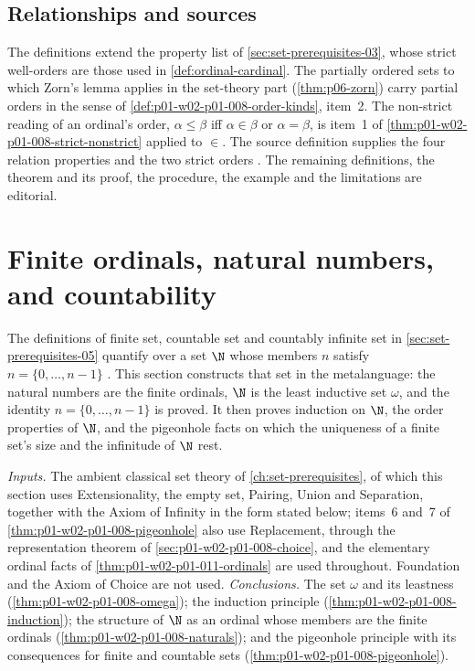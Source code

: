 \subsection{Relationships and sources}
\label{sec:p01-w02-p01-008-orders-sources}

The definitions extend the property list of \cref{sec:set-prerequisites-03},
whose strict well-orders are those used in \cref{def:ordinal-cardinal}. The
partially ordered sets to which Zorn's lemma applies in the set-theory part
(\cref{thm:p06-zorn}) carry partial orders in the sense of
\cref{def:p01-w02-p01-008-order-kinds}, item~2.
The non-strict reading of an ordinal's order, \(\alpha\leq\beta\) iff
\(\alpha\in\beta\) or \(\alpha=\beta\), is item~1 of
\cref{thm:p01-w02-p01-008-strict-nonstrict} applied to \(\in\). The source
definition supplies the four relation properties and the two strict orders
\cite[ch.~``Sets, Relations, Functions, and Cardinality'', sec.~``Relations
and functions'', definition ``Properties of a binary
relation'']{FrozenFormalLogicOrdersChoice}. The remaining definitions, the
theorem and its proof, the procedure, the example and the limitations are
editorial.

\section{Finite ordinals, natural numbers, and countability}
\label{sec:p01-w02-p01-008-naturals}

The definitions of finite set, countable set and countably infinite set in
\cref{sec:set-prerequisites-05} quantify over a set \(\N\) whose members
\(n\) satisfy \(n=\{0,\ldots,n-1\}\) \cite[ch.~``Sets, Relations, Functions,
and Cardinality'', sec.~``Finite, countable, and uncountable sets'',
definitions ``Finite set'' and ``Countable set'']{FrozenFormalLogicOrdersChoice}.
This section constructs that set in the metalanguage: the natural numbers
are the finite ordinals, \(\N\) is the least inductive set \(\omega\), and
the identity \(n=\{0,\ldots,n-1\}\) is proved. It then proves induction on
\(\N\), the order properties of \(\N\), and the pigeonhole facts on which
the uniqueness of a finite set's size and the infinitude of \(\N\) rest.

\emph{Inputs.} The ambient classical set theory of
\cref{ch:set-prerequisites}, of which this section uses Extensionality, the
empty set, Pairing, Union and Separation, together with the Axiom of
Infinity in the form stated below; items~6 and~7 of
\cref{thm:p01-w02-p01-008-pigeonhole} also use Replacement, through the
representation theorem of \cref{sec:p01-w02-p01-008-choice}, and the
elementary ordinal facts of \cref{thm:p01-w02-p01-011-ordinals} are used
throughout. Foundation and the Axiom of Choice are not used. \emph{Conclusions.} The set \(\omega\) and its leastness
(\cref{thm:p01-w02-p01-008-omega}); the induction principle
(\cref{thm:p01-w02-p01-008-induction}); the structure of \(\N\) as an ordinal
whose members are the finite ordinals (\cref{thm:p01-w02-p01-008-naturals});
and the pigeonhole principle with its consequences for finite and countable
sets (\cref{thm:p01-w02-p01-008-pigeonhole}).

